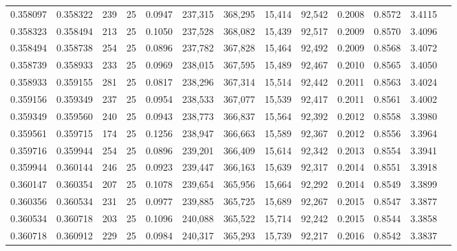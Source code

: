 \begin{tabular}{rrrrrrrrrrrrr}
0.358097 & 0.358322 &   239 &  25 &                                     0.0947 & 237,315 & 368,295 &  15,414 &  92,542 & 0.2008 & 0.8572 & 3.4115 \\
0.358323 & 0.358494 &   213 &  25 &                                     0.1050 & 237,528 & 368,082 &  15,439 &  92,517 & 0.2009 & 0.8570 & 3.4096 \\
0.358494 & 0.358738 &   254 &  25 &                                     0.0896 & 237,782 & 367,828 &  15,464 &  92,492 & 0.2009 & 0.8568 & 3.4072 \\
0.358739 & 0.358933 &   233 &  25 &                                     0.0969 & 238,015 & 367,595 &  15,489 &  92,467 & 0.2010 & 0.8565 & 3.4050 \\
0.358933 & 0.359155 &   281 &  25 &                                     0.0817 & 238,296 & 367,314 &  15,514 &  92,442 & 0.2011 & 0.8563 & 3.4024 \\
0.359156 & 0.359349 &   237 &  25 &                                     0.0954 & 238,533 & 367,077 &  15,539 &  92,417 & 0.2011 & 0.8561 & 3.4002 \\
0.359349 & 0.359560 &   240 &  25 &                                     0.0943 & 238,773 & 366,837 &  15,564 &  92,392 & 0.2012 & 0.8558 & 3.3980 \\
0.359561 & 0.359715 &   174 &  25 &                                     0.1256 & 238,947 & 366,663 &  15,589 &  92,367 & 0.2012 & 0.8556 & 3.3964 \\
0.359716 & 0.359944 &   254 &  25 &                                     0.0896 & 239,201 & 366,409 &  15,614 &  92,342 & 0.2013 & 0.8554 & 3.3941 \\
0.359944 & 0.360144 &   246 &  25 &                                     0.0923 & 239,447 & 366,163 &  15,639 &  92,317 & 0.2014 & 0.8551 & 3.3918 \\
0.360147 & 0.360354 &   207 &  25 &                                     0.1078 & 239,654 & 365,956 &  15,664 &  92,292 & 0.2014 & 0.8549 & 3.3899 \\
0.360356 & 0.360534 &   231 &  25 &                                     0.0977 & 239,885 & 365,725 &  15,689 &  92,267 & 0.2015 & 0.8547 & 3.3877 \\
0.360534 & 0.360718 &   203 &  25 &                                     0.1096 & 240,088 & 365,522 &  15,714 &  92,242 & 0.2015 & 0.8544 & 3.3858 \\
0.360718 & 0.360912 &   229 &  25 &                                     0.0984 & 240,317 & 365,293 &  15,739 &  92,217 & 0.2016 & 0.8542 & 3.3837 \\

\end{tabular}
